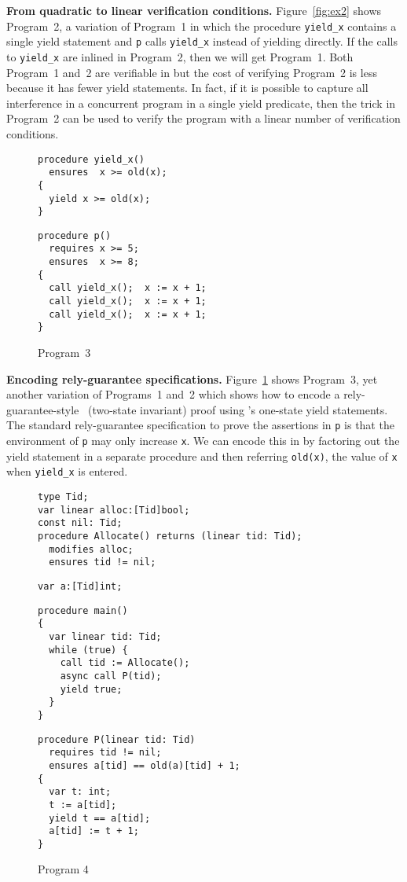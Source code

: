 {\bf From quadratic to linear verification conditions.}
Figure~\ref{fig:ex2} shows Program~2, a variation of Program~1 in which the procedure {\tt yield\_x} 
contains a single yield statement and {\tt p} calls {\tt yield\_x} instead of yielding directly.
If the calls to {\tt yield\_x} are inlined in Program~2, then we will get Program~1.
Both Program~1 and~2 are verifiable in \civl but the cost of verifying Program~2 is less because it has fewer yield statements.
In fact, if it is possible to capture all interference in a concurrent program in a single yield predicate, 
then the trick in Program~2 can be used to verify the program with a linear number of verification conditions.

\begin{figure}
\begin{verbatim}
procedure yield_x()
  ensures  x >= old(x);
{
  yield x >= old(x);
}
\end{verbatim}
\begin{verbatim}
procedure p()
  requires x >= 5;
  ensures  x >= 8;
{
  call yield_x();  x := x + 1;
  call yield_x();  x := x + 1;
  call yield_x();  x := x + 1;
}
\end{verbatim}
\caption{Program~3}
\label{fig:ex3}
\end{figure}

{\bf Encoding rely-guarantee specifications.}
Figure~\ref{fig:ex3} shows Program~3, yet another variation of Programs~1 and~2 which shows how to encode a rely-guarantee-style~\cite{Jones83} (two-state invariant)
proof using \civl's one-state yield statements. 
The standard rely-guarantee specification to prove the assertions in {\tt p} is that the environment of {\tt p} 
may only increase {\tt x}.
We can encode this in \civl by factoring out the yield statement in a separate procedure
and then referring {\tt old(x)}, the value of {\tt x} when {\tt yield\_x} is
entered. 


\begin{figure}
\begin{verbatim}
type Tid;
var linear alloc:[Tid]bool;
const nil: Tid;
procedure Allocate() returns (linear tid: Tid);
  modifies alloc;
  ensures tid != nil;
\end{verbatim}
\begin{verbatim}
var a:[Tid]int;
\end{verbatim}
\begin{verbatim}
procedure main()
{
  var linear tid: Tid;
  while (true) {
    call tid := Allocate();
    async call P(tid);
    yield true;
  }
}
\end{verbatim}
\begin{verbatim}
procedure P(linear tid: Tid)
  requires tid != nil;
  ensures a[tid] == old(a)[tid] + 1;
{
  var t: int;
  t := a[tid];
  yield t == a[tid];
  a[tid] := t + 1;
}
\end{verbatim}
\caption{Program 4}
\label{fig:ex5}
\end{figure}

